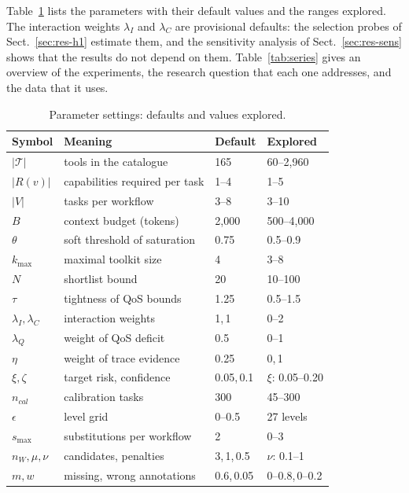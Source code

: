 \documentclass[10pt]{article}
\begin{document}
Table~\ref{tab:params} lists the parameters with their default values and the ranges explored. The interaction weights $\lambda_I$ and $\lambda_C$ are provisional defaults: the selection probes of Sect.~\ref{sec:res-h1} estimate them, and the sensitivity analysis of Sect.~\ref{sec:res-sens} shows that the results do not depend on them. Table~\ref{tab:series} gives an overview of the experiments, the research question that each one addresses, and the data that it uses.

\begin{table}[!ht]\centering
\caption{Parameter settings: defaults and values explored.}\label{tab:params}
\scriptsize\setlength{\tabcolsep}{3pt}
\begin{tabular}{llll}\toprule
Symbol & Meaning & Default & Explored \\ \midrule
$|\mathcal{T}|$ & tools in the catalogue & 165 & 60--2{,}960 \\
$|R(v)|$ & capabilities required per task & 1--4 & 1--5 \\
$|V|$ & tasks per workflow & 3--8 & 3--10 \\
$B$ & context budget (tokens) & 2{,}000 & 500--4{,}000 \\
$\theta$ & soft threshold of saturation & 0.75 & 0.5--0.9 \\
$k_{\max}$ & maximal toolkit size & 4 & 3--8 \\
$N$ & shortlist bound & 20 & 10--100 \\
$\tau$ & tightness of QoS bounds & 1.25 & 0.5--1.5 \\
$\lambda_I,\lambda_C$ & interaction weights & 1,\,1 & 0--2 \\
$\lambda_Q$ & weight of QoS deficit & 0.5 & 0--1 \\
$\eta$ & weight of trace evidence & 0.25 & 0,\,1 \\
$\xi,\zeta$ & target risk, confidence & 0.05,\,0.1 & $\xi$: 0.05--0.20 \\
$n_{cal}$ & calibration tasks & 300 & 45--300 \\
$\epsilon$ & level grid & 0--0.5 & 27 levels \\
$s_{\max}$ & substitutions per workflow & 2 & 0--3 \\
$n_W,\mu,\nu$ & candidates, penalties & 3,\,1,\,0.5 & $\nu$: 0.1--1 \\
$m,w$ & missing, wrong annotations & 0.6,\,0.05 & 0--0.8,\,0--0.2 \\ \bottomrule
\end{tabular}\end{table}
\end{document}
